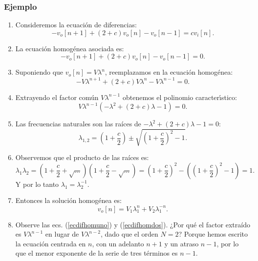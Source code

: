 \documentclass[11pt,a4paper,openany]{book}
\begin{document}
\subsubsection{Ejemplo}

\begin{enumerate}
	\item Consideremos la ecuaci\'{o}n de diferencias:
	\begin{equation}
		-v_{o}[n+1] + (2+c) v_{o}[n] - v_{o}[n-1] = c v_{i}[n].
	\end{equation}
	
	\item La ecuaci\'{o}n homog\'{e}nea asociada es:
	\begin{equation}
		-v_{o}[n+1] + (2+c) v_{o}[n] - v_{o}[n-1] = 0.
	\end{equation}
	
	\item Suponiendo que $v_{o}[n] = V \lambda^{n}$, reemplazamos en la ecuaci\'{o}n homog\'{e}nea:
	\begin{equation}
		-V \lambda^{n+1} + (2 + c) V \lambda^{n} - V \lambda^{n-1} = 0. \label{ecdifhomuno}
	\end{equation}
	
	\item Extrayendo el factor com\'{u}n $V \lambda^{n-1}$ obtenemos el polinomio caracter\'{\i}stico:
	\begin{equation}
		V \lambda^{n-1} (-\lambda^{2} + (2 + c) \lambda - 1) = 0. \label{ecdifhomdos}
	\end{equation}
	
	\item Las frecuencias naturales son las raíces de $-\lambda^{2} + (2 + c) \lambda - 1 = 0$:
	\begin{equation}
		\lambda_{1,2} = \left( 1+\frac{c}{2}\right) \pm \sqrt{\left( 1+\frac{c}{2}\right)^{2}-1}.
	\end{equation}
	
	\item Observemos que el producto de las raíces es:
	\begin{equation}
		\lambda_1 \lambda_2 = \left( 1+\frac{c}{2} + \sqrt{\dots} \right) \left( 1+\frac{c}{2} - \sqrt{\dots} \right) = \left( 1+\frac{c}{2}\right)^2 - \left(\left( 1+\frac{c}{2}\right)^2 - 1\right) = 1.
	\end{equation}
	Y por lo tanto $\lambda_{1} = \lambda_{2}^{-1}$.
	
	\item Entonces la soluci\'{o}n homog\'{e}nea es:
	\begin{equation}
		v_{o}[n] = V_{1} \lambda_{1}^n + V_{2} \lambda_{1}^{-n}.
	\end{equation}
	
	\item Observe las ecs. (\ref{ecdifhomuno}) y (\ref{ecdifhomdos}). ¿Por qué el factor extraído es $V \lambda^{n-1}$ en lugar de $V \lambda^{n-2}$, dado que el orden $N=2$? Porque hemos escrito la ecuación centrada en $n$, con un adelanto $n+1$ y un atraso $n-1$, por lo que el menor exponente de la serie de tres términos es $n-1$.
\end{enumerate}
\end{document}
